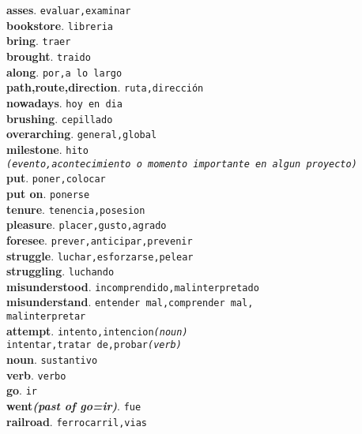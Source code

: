 \documentclass[twocolumn]{article}
\begin{document}
	\textsf{\textbf{asses}}. \texttt{evaluar,examinar}\\
	\textsf{\textbf{bookstore}}. \texttt{libreria}\\
	\textsf{\textbf{bring}}. \texttt{traer}\\
	\textsf{\textbf{brought}}. \texttt{traido}\\
	\textsf{\textbf{along}}. \texttt{por,a lo largo}\\
	\textsf{\textbf{path,route,direction}}. \texttt{ruta,direcci\'on}\\
	\textsf{\textbf{nowadays}}. \texttt{hoy en dia}\\
	\textsf{\textbf{brushing}}. \texttt{cepillado}\\
	\textsf{\textbf{overarching}}. \texttt{general,global}\\
	\textsf{\textbf{milestone}}. \texttt{hito\\{\scriptsize \textsl{(evento,acontecimiento o momento importante en algun proyecto)}}}\\
	\textsf{\textbf{put}}. \texttt{poner,colocar}\\
	\textsf{\textbf{put on}}. \texttt{ponerse}\\
	\textsf{\textbf{tenure}}. \texttt{tenencia,posesion}\\
	\textsf{\textbf{pleasure}}. \texttt{placer,gusto,agrado}\\
	\textsf{\textbf{foresee}}. \texttt{prever,anticipar,prevenir}\\
	\textsf{\textbf{struggle}}. \texttt{luchar,esforzarse,pelear}\\
	\textsf{\textbf{struggling}}. \texttt{luchando}\\
	\textsf{\textbf{misunderstood}}. \texttt{incomprendido,malinterpretado}\\
	\textsf{\textbf{misunderstand}}. \texttt{entender mal,comprender mal,\\malinterpretar}\\
	\textsf{\textbf{attempt}}. \texttt{intento,intencion{\scriptsize \textsl{(noun)}}\\intentar,tratar de,probar{\scriptsize \textsl{(verb)}}}\\
	\textsf{\textbf{noun}}. \texttt{sustantivo}\\
	\textsf{\textbf{verb}}. \texttt{verbo}\\
	\textsf{\textbf{go}}. \texttt{ir}\\
	\textsf{\textbf{went{\scriptsize \textsl{(past of go=ir)}}}}. \texttt{fue}\\
	\textsf{\textbf{railroad}}. \texttt{ferrocarril,vias}\\
\end{document}
